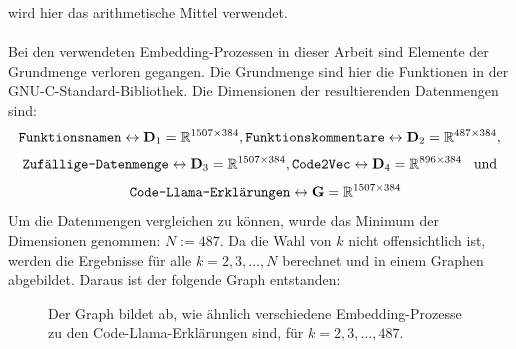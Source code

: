 \documentclass[12pt,letterpaper,ngerman]{article}
\begin{document}
wird hier das arithmetische Mittel verwendet.\\
\pagebreak\\
Bei den verwendeten Embedding-Prozessen in dieser Arbeit sind Elemente
der Grundmenge verloren gegangen. Die Grundmenge sind hier die Funktionen
in der GNU-C-Standard-Bibliothek.
Die Dimensionen der resultierenden Datenmengen sind: 
\[
  \verb|Funktionsnamen| \leftrightarrow \mathbf{D}_1=\mathbb{R}^{1507\times 384},
  \verb|Funktionskommentare| \leftrightarrow \mathbf{D}_2=\mathbb{R}^{487\times 384},
\]
\[
  \verb|Zufällige-Datenmenge|\leftrightarrow \mathbf{D}_3=\mathbb{R}^{1507\times 384},
  \verb|Code2Vec| \leftrightarrow \mathbf{D}_4=\mathbb{R}^{896\times 384} \hspace{0.3cm}\text{und}
\]
\[
  \hspace{0.3cm} \verb|Code-Llama-Erklärungen| \leftrightarrow \mathbf{G}=\mathbb{R}^{1507\times 384}
\]
Um die Datenmengen vergleichen zu können, wurde das Minimum der Dimensionen 
genommen: $N:= 487 $. Da die Wahl von $k$ nicht offensichtlich ist, werden
die Ergebnisse für alle $k = 2, 3, \dots, N$ berechnet und in einem 
Graphen abgebildet. Daraus ist der folgende Graph entstanden: \\
\begin{figure}[H]
  \begin{center}
  \end{center}
  \caption{
    Der Graph bildet ab, wie ähnlich verschiedene Embedding-Prozesse
    zu den Code-Llama-Erklärungen sind, für $k=2,3, \dots ,487 $.
  }
\end{figure}\hfill\\
\end{document}
